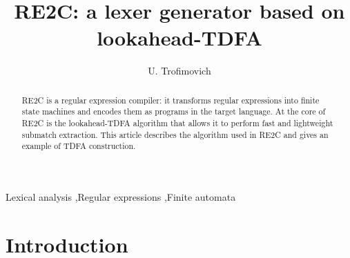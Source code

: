 \documentclass[preprint,12pt, a4paper]{elsarticle}
\begin{document}
\begin{frontmatter}



\title{RE2C: a lexer generator based on lookahead-TDFA}


\author{U. Trofimovich}

\begin{abstract}
RE2C is a regular expression compiler:
it transforms regular expressions into finite state machines
and encodes them as programs in the target language.
At the core of RE2C is the lookahead-TDFA algorithm
that allows it to perform fast and lightweight submatch extraction.
This article describes the algorithm used in RE2C and gives an example of TDFA construction.
\end{abstract}

\begin{keyword}
Lexical analysis \sep Regular expressions \sep Finite automata



\end{keyword}

\end{frontmatter}


\section{Introduction}
\end{document}

